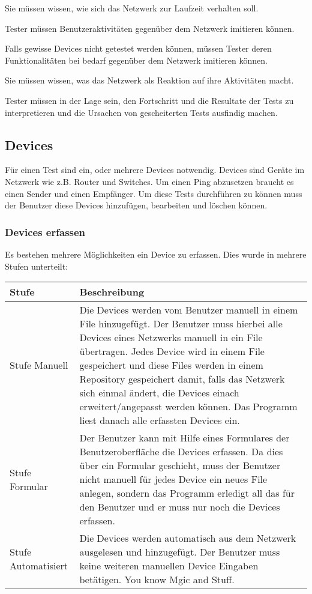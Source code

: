 \documentclass[
	ngerman,
	toc=listof, %
	toc=bibliography, %
	footnotes=multiple, %
	parskip=half, %
	numbers=noendperiod %
]{scrartcl}
\begin{document}
			Sie müssen wissen, wie sich das Netzwerk zur Laufzeit verhalten soll.

			Tester müssen Benutzeraktivitäten gegenüber dem Netzwerk imitieren können.

			Falls gewisse Devices nicht getestet werden können, müssen Tester deren Funktionalitäten bei bedarf gegenüber dem Netzwerk imitieren können.

			Sie müssen wissen, was das Netzwerk als Reaktion auf ihre Aktivitäten macht.

			Tester müssen in der Lage sein, den Fortschritt und die Resultate der Tests zu interpretieren und die Ursachen von gescheiterten Tests ausfindig machen.


	\subsection{Devices}
		Für einen Test sind ein, oder mehrere Devices notwendig. Devices sind Geräte im Netzwerk wie z.B. Router und Switches.
		Um einen Ping abzusetzen braucht es einen Sender und einen Empfänger.
		Um diese Tests durchführen zu können muss der Benutzer diese Devices hinzufügen, bearbeiten und löschen können. 

		\subsubsection{Devices erfassen}
			Es bestehen mehrere Möglichkeiten ein Device zu erfassen. Dies wurde in mehrere Stufen unterteilt:\\

			\begin{tabularx}{\textwidth}{lX}
				\toprule
				Stufe & Beschreibung\\
				\midrule
				Stufe Manuell & Die Devices werden vom Benutzer manuell in einem File hinzugefügt. Der Benutzer muss hierbei alle Devices eines Netzwerks manuell in ein File übertragen. Jedes Device wird in einem File gespeichert und diese Files werden in einem Repository gespeichert damit, falls das Netzwerk sich einmal ändert, die Devices einach erweitert/angepasst werden können. Das Programm liest danach alle erfassten Devices ein. \\
				\midrule
				Stufe Formular & Der Benutzer kann mit Hilfe eines Formulares der Benutzeroberfläche die Devices erfassen. Da dies über ein Formular geschieht, muss der Benutzer nicht manuell für jedes Device ein neues File anlegen, sondern das Programm erledigt all das für den Benutzer und er muss nur noch die Devices erfassen.\\
				\midrule
				Stufe Automatisiert & Die Devices werden automatisch aus dem Netzwerk ausgelesen und hinzugefügt. Der Benutzer muss keine weiteren manuellen Device Eingaben betätigen. You know Mgic and Stuff. \\
				\bottomrule
			\end{tabularx}
\end{document}
